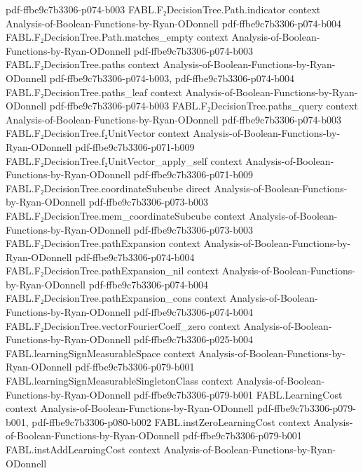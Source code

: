 \begin{theorem}
  {pdf-ffbe9c7b3306-p074-b003}
\proofstep
  {FABL.F₂DecisionTree.Path.indicator}
  {context}
  {Analysis-of-Boolean-Functions-by-Ryan-ODonnell}
  {pdf-ffbe9c7b3306-p074-b004}
\proofstep
  {FABL.F₂DecisionTree.Path.matches_empty}
  {context}
  {Analysis-of-Boolean-Functions-by-Ryan-ODonnell}
  {pdf-ffbe9c7b3306-p074-b003}
\proofstep
  {FABL.F₂DecisionTree.paths}
  {context}
  {Analysis-of-Boolean-Functions-by-Ryan-ODonnell}
  {pdf-ffbe9c7b3306-p074-b003,
    pdf-ffbe9c7b3306-p074-b004}
\proofstep
  {FABL.F₂DecisionTree.paths_leaf}
  {context}
  {Analysis-of-Boolean-Functions-by-Ryan-ODonnell}
  {pdf-ffbe9c7b3306-p074-b003}
\proofstep
  {FABL.F₂DecisionTree.paths_query}
  {context}
  {Analysis-of-Boolean-Functions-by-Ryan-ODonnell}
  {pdf-ffbe9c7b3306-p074-b003}
\proofstep
  {FABL.F₂DecisionTree.f₂UnitVector}
  {context}
  {Analysis-of-Boolean-Functions-by-Ryan-ODonnell}
  {pdf-ffbe9c7b3306-p071-b009}
\proofstep
  {FABL.F₂DecisionTree.f₂UnitVector_apply_self}
  {context}
  {Analysis-of-Boolean-Functions-by-Ryan-ODonnell}
  {pdf-ffbe9c7b3306-p071-b009}
\proofstep
  {FABL.F₂DecisionTree.coordinateSubcube}
  {direct}
  {Analysis-of-Boolean-Functions-by-Ryan-ODonnell}
  {pdf-ffbe9c7b3306-p073-b003}
\proofstep
  {FABL.F₂DecisionTree.mem_coordinateSubcube}
  {context}
  {Analysis-of-Boolean-Functions-by-Ryan-ODonnell}
  {pdf-ffbe9c7b3306-p073-b003}
\proofstep
  {FABL.F₂DecisionTree.pathExpansion}
  {context}
  {Analysis-of-Boolean-Functions-by-Ryan-ODonnell}
  {pdf-ffbe9c7b3306-p074-b004}
\proofstep
  {FABL.F₂DecisionTree.pathExpansion_nil}
  {context}
  {Analysis-of-Boolean-Functions-by-Ryan-ODonnell}
  {pdf-ffbe9c7b3306-p074-b004}
\proofstep
  {FABL.F₂DecisionTree.pathExpansion_cons}
  {context}
  {Analysis-of-Boolean-Functions-by-Ryan-ODonnell}
  {pdf-ffbe9c7b3306-p074-b004}
\proofstep
  {FABL.F₂DecisionTree.vectorFourierCoeff_zero}
  {context}
  {Analysis-of-Boolean-Functions-by-Ryan-ODonnell}
  {pdf-ffbe9c7b3306-p025-b004}
\proofstep
  {FABL.learningSignMeasurableSpace}
  {context}
  {Analysis-of-Boolean-Functions-by-Ryan-ODonnell}
  {pdf-ffbe9c7b3306-p079-b001}
\proofstep
  {FABL.learningSignMeasurableSingletonClass}
  {context}
  {Analysis-of-Boolean-Functions-by-Ryan-ODonnell}
  {pdf-ffbe9c7b3306-p079-b001}
\proofstep
  {FABL.LearningCost}
  {context}
  {Analysis-of-Boolean-Functions-by-Ryan-ODonnell}
  {pdf-ffbe9c7b3306-p079-b001,
    pdf-ffbe9c7b3306-p080-b002}
\proofstep
  {FABL.instZeroLearningCost}
  {context}
  {Analysis-of-Boolean-Functions-by-Ryan-ODonnell}
  {pdf-ffbe9c7b3306-p079-b001}
\proofstep
  {FABL.instAddLearningCost}
  {context}
  {Analysis-of-Boolean-Functions-by-Ryan-ODonnell}

\end{theorem}
